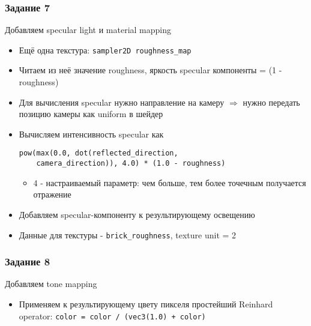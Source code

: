 \documentclass{beamer}
\begin{document}
\begin{frame}[fragile]
\frametitle{Задание 7}
Добавляем specular light и material mapping
\begin{itemize}
\item Ещё одна текстура: \verb|sampler2D roughness_map|
\pause
\item Читаем из неё значение roughness, яркость specular компоненты = (1 - roughness)
\pause
\item Для вычисления specular нужно направление на камеру \begin{math}\Rightarrow\end{math} нужно передать позицию камеры как uniform в шейдер
\pause
\item Вычисляем интенсивность specular как
\begin{verbatim}
pow(max(0.0, dot(reflected_direction, 
    camera_direction)), 4.0) * (1.0 - roughness)
\end{verbatim}
\begin{itemize}
\item 4 - настраиваемый параметр: чем больше, тем более точечным получается отражение
\end{itemize}
\pause
\item Добавляем specular-компоненту к результирующему освещению
\pause
\item Данные для текстуры - \verb|brick_roughness|, texture unit = 2
\end{itemize}
\end{frame}

\begin{frame}[fragile]
\frametitle{Задание 8}
Добавляем tone mapping
\begin{itemize}
\item Применяем к результирующему цвету пикселя простейший Reinhard operator: \verb|color = color / (vec3(1.0) + color)|
\end{itemize}
\end{frame}
\end{document}
